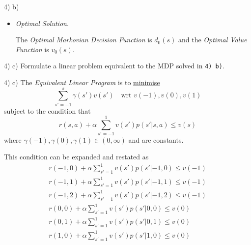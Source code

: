 \documentclass[11pt,a4paper]{article}
\begin{document}
\begin{answer}{4) b)}
\begin{itemize}
\begin{center}
\begin{tabular}{rcl}
        $d_1(s)$&=&\begin{tabular}{c|c}
          $s$&$d_1(s)$\\\hline
          -1&2\\
          0&1\\
          1&0
        \end{tabular}
      \end{tabular}
    \end{center}
    \underline{Stopping Criterion} - As $d_1(s)=d_0(s)\ \forall\ s\in S$, then $d_1(s)$ is optimal.
    \item \textit{Optimal Solution}.
    \par The \textit{Optimal Markovian Decision Function} is $d_0(s)$ and the \textit{Optimal Value Function} is $v_0(s)$.
  \end{itemize}
\end{answer}

\begin{question}{4) c)}
  Formulate a linear problem equivalent to the MDP solved in \texttt{4) b)}.
\end{question}

\begin{answer}{4) c)}
  The \textit{Equivalent Linear Program} is to \underline{minimise}
  \[ \sum_{s'=-1}^s\gamma(s')v(s')\quad\text{wrt }v(-1),v(0),v(1) \]
  subject to the condition that
  \[ r(s,a)+\alpha\sum_{s'=-1}^1v(s')p(s'|s,a)\leq v(s) \]
  where $\gamma(-1),\gamma(0),\gamma(1)\in(0,\infty)$ and are constants.
  \par This condition can be expanded and restated as
  \[\begin{array}{rcl}
    r(-1,0)+\alpha\sum_{s'=1}^1v(s')p(s'|-1,0)\leq v(-1)\\
    r(-1,1)+\alpha\sum_{s'=1}^1v(s')p(s'|-1,1)\leq v(-1)\\
    r(-1,2)+\alpha\sum_{s'=1}^1v(s')p(s'|-1,2)\leq v(-1)\\
    r(0,0)+\alpha\sum_{s'=1}^1v(s')p(s'|0,0)\leq v(0)\\
    r(0,1)+\alpha\sum_{s'=1}^1v(s')p(s'|0,1)\leq v(0)\\
    r(1,0)+\alpha\sum_{s'=1}^1v(s')p(s'|1,0)\leq v(0)
  \end{array}\]
\end{answer}
\end{document}
